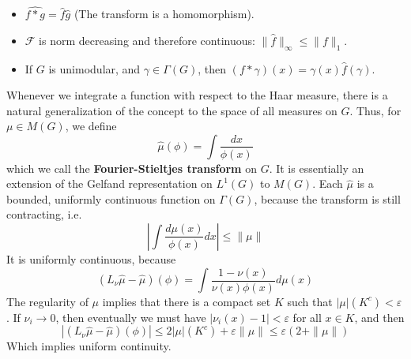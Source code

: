 \begin{itemize}
    \item $\widehat{f * g} = \widehat{f} \widehat{g}$ (The transform is a homomorphism).
    \item $\mathcal{F}$ is norm decreasing and therefore continuous: $\| \widehat{f} \|_\infty \leq \| f \|_1$.
    \item If $G$ is unimodular, and $\gamma \in \Gamma(G)$, then $(f * \gamma)(x) = \gamma(x) \widehat{f}(\gamma)$.
\end{itemize}

Whenever we integrate a function with respect to the Haar measure, there is a natural generalization of the concept to the space of all measures on $G$. Thus, for $\mu \in M(G)$, we define
%
\[ \widehat{\mu}(\phi) = \int \frac{dx}{\phi(x)} \]
%
which we call the {\bf Fourier-Stieltjes transform} on $G$. It is essentially an extension of the Gelfand representation on $L^1(G)$ to $M(G)$. Each $\widehat{\mu}$ is a bounded, uniformly continuous function on $\Gamma(G)$, because the transform is still contracting, i.e.
%
\[ \left| \int \frac{d\mu(x)}{\phi(x)} dx \right| \leq \| \mu \| \]
%
It is uniformly continuous, because
%
\[ (L_{\nu} \widehat{\mu} - \widehat{\mu})(\phi) = \int \frac{1 - \nu(x)}{\nu(x) \phi(x)} d\mu(x)  \]
%
The regularity of $\mu$ implies that there is a compact set $K$ such that $|\mu|(K^c) < \varepsilon$. If $\nu_i \to 0$, then eventually we must have $|\nu_i(x) - 1| < \varepsilon$ for all $x \in K$, and then
%
\[ |(L_{\nu} \widehat{\mu} - \widehat{\mu})(\phi)| \leq 2|\mu|(K^c) + \varepsilon \| \mu \| \leq \varepsilon(2 + \|\mu\|) \]
%
Which implies uniform continuity.

